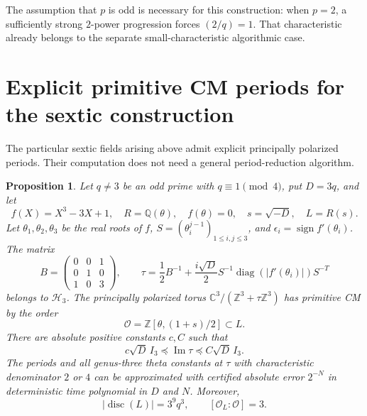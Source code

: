 \documentclass[11pt]{article}
\newtheorem{proposition}[theorem]{Proposition}
\theoremstyle{definition}
\theoremstyle{remark}
\begin{document}
The assumption that \(p\) is odd is necessary for this construction:
when \(p=2\), a sufficiently strong \(2\)-power progression forces
\((2/q)=1\). That characteristic already belongs to the separate
small-characteristic algorithmic case.

\section{Explicit primitive CM periods for the sextic construction}
\label{sec:sextic-cm-periods}

The particular sextic fields arising above admit explicit
principally polarized periods. Their computation does not need
a general period-reduction algorithm.

\begin{proposition}\label{prop:explicit-sextic-cm-periods}
Let \(q\ne3\) be an odd prime with \(q\equiv1\pmod4\), put
\(D=3q\), and let
\[
 f(X)=X^3-3X+1,\quad R=\mathbb Q(\theta),\quad f(\theta)=0,
 \quad s=\sqrt{-D},\quad L=R(s).
\]
Let \(\theta_1,\theta_2,\theta_3\) be the real roots of \(f\),
\(S=(\theta_i^{j-1})_{1\leq i,j\leq3}\), and
\(\epsilon_i=\operatorname{sign}f'(\theta_i)\).
The matrix
\[
 B=\begin{pmatrix}0&0&1\\0&1&0\\1&0&3\end{pmatrix},
 \qquad
 \tau=\frac12B^{-1}
 +\frac{i\sqrt D}{2}
 S^{-1}\operatorname{diag}(|f'(\theta_i)|)S^{-T}
\]
belongs to \(\mathcal H_3\). The principally polarized torus
\(\mathbb C^3/(\mathbb Z^3+\tau\mathbb Z^3)\)
has primitive CM by the order
\[
 \mathcal O=\mathbb Z[\theta,(1+s)/2]\subset L.
\]
There are absolute positive constants \(c,C\) such that
\[
 c\sqrt D\,I_3\preceq\operatorname{Im}\tau
                   \preceq C\sqrt D\,I_3.
\]
The periods and all genus-three theta constants at \(\tau\)
with characteristic denominator \(2\) or \(4\)
can be approximated with certified absolute error \(2^{-N}\)
in deterministic time polynomial in \(D\) and \(N\).
Moreover,
\[
 |\operatorname{disc}(L)|=3^9q^3,
 \qquad [\mathcal O_L:\mathcal O]=3.
\]
\end{proposition}
\end{document}
